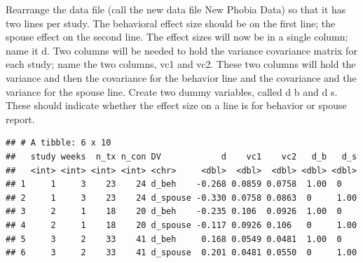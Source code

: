 \documentclass[]{article}
\newenvironment{Shaded}{\begin{snugshade}}{\end{snugshade}}
\newcommand{\KeywordTok}[1]{\textcolor[rgb]{0.13,0.29,0.53}{\textbf{#1}}}
\newcommand{\DataTypeTok}[1]{\textcolor[rgb]{0.13,0.29,0.53}{#1}}
\newcommand{\DecValTok}[1]{\textcolor[rgb]{0.00,0.00,0.81}{#1}}
\newcommand{\StringTok}[1]{\textcolor[rgb]{0.31,0.60,0.02}{#1}}
\newcommand{\CommentTok}[1]{\textcolor[rgb]{0.56,0.35,0.01}{\textit{#1}}}
\newcommand{\OperatorTok}[1]{\textcolor[rgb]{0.81,0.36,0.00}{\textbf{#1}}}
\newcommand{\NormalTok}[1]{#1}
\begin{document}
Rearrange the data file (call the new data file New Phobia Data) so that
it has two lines per study. The behavioral effect size should be on the
first line; the spouse effect on the second line. The effect sizes will
now be in a single column; name it d. Two columns will be needed to hold
the variance covariance matrix for each study; name the two columns, vc1
and vc2. These two columns will hold the variance and then the
covariance for the behavior line and the covariance and the variance for
the spouse line. Create two dummy variables, called d b and d s. These
should indicate whether the effect size on a line is for behavior or
spouse report.

\begin{Shaded}
\end{Shaded}

\begin{verbatim}
## # A tibble: 6 x 10
##   study weeks  n_tx n_con DV            d    vc1    vc2   d_b   d_s
##   <int> <int> <int> <int> <chr>     <dbl>  <dbl>  <dbl> <dbl> <dbl>
## 1     1     3    23    24 d_beh    -0.268 0.0859 0.0758  1.00  0   
## 2     1     3    23    24 d_spouse -0.330 0.0758 0.0863  0     1.00
## 3     2     1    18    20 d_beh    -0.235 0.106  0.0926  1.00  0   
## 4     2     1    18    20 d_spouse -0.117 0.0926 0.106   0     1.00
## 5     3     2    33    41 d_beh     0.168 0.0549 0.0481  1.00  0   
## 6     3     2    33    41 d_spouse  0.201 0.0481 0.0550  0     1.00
\end{verbatim}
\end{document}
